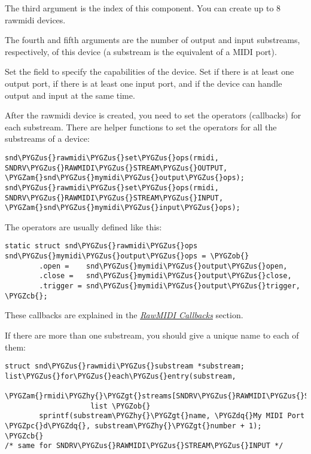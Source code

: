 \documentclass[a4paper,8pt,english]{sphinxmanual}
\def\PYGZus{\char`\_}
\def\PYGZob{\char`\{}
\def\PYGZcb{\char`\}}
\def\PYGZam{\char`\&}
\def\PYGZgt{\char`\>}
\def\PYGZpc{\char`\%}
\def\PYGZhy{\char`\-}
\def\PYGZdq{\char`\"}
\begin{document}
The third argument is the index of this component. You can create up to
8 rawmidi devices.

The fourth and fifth arguments are the number of output and input
substreams, respectively, of this device (a substream is the equivalent
of a MIDI port).

Set the  field to specify the capabilities of the
device. Set  if there is at least one
output port,  if there is at least one
input port, and  if the device can handle
output and input at the same time.

After the rawmidi device is created, you need to set the operators
(callbacks) for each substream. There are helper functions to set the
operators for all the substreams of a device:

\begin{Verbatim}[commandchars=\\\{\}]
snd\PYGZus{}rawmidi\PYGZus{}set\PYGZus{}ops(rmidi, SNDRV\PYGZus{}RAWMIDI\PYGZus{}STREAM\PYGZus{}OUTPUT, \PYGZam{}snd\PYGZus{}mymidi\PYGZus{}output\PYGZus{}ops);
snd\PYGZus{}rawmidi\PYGZus{}set\PYGZus{}ops(rmidi, SNDRV\PYGZus{}RAWMIDI\PYGZus{}STREAM\PYGZus{}INPUT, \PYGZam{}snd\PYGZus{}mymidi\PYGZus{}input\PYGZus{}ops);
\end{Verbatim}

The operators are usually defined like this:

\begin{Verbatim}[commandchars=\\\{\}]
static struct snd\PYGZus{}rawmidi\PYGZus{}ops snd\PYGZus{}mymidi\PYGZus{}output\PYGZus{}ops = \PYGZob{}
        .open =    snd\PYGZus{}mymidi\PYGZus{}output\PYGZus{}open,
        .close =   snd\PYGZus{}mymidi\PYGZus{}output\PYGZus{}close,
        .trigger = snd\PYGZus{}mymidi\PYGZus{}output\PYGZus{}trigger,
\PYGZcb{};
\end{Verbatim}

These callbacks are explained in the {\hyperref[sound/kernel\string-api/writing\string-an\string-alsa\string-driver:rawmidi\string-callbacks]{\emph{RawMIDI Callbacks}}} section.

If there are more than one substream, you should give a unique name to
each of them:

\begin{Verbatim}[commandchars=\\\{\}]
struct snd\PYGZus{}rawmidi\PYGZus{}substream *substream;
list\PYGZus{}for\PYGZus{}each\PYGZus{}entry(substream,
                    \PYGZam{}rmidi\PYGZhy{}\PYGZgt{}streams[SNDRV\PYGZus{}RAWMIDI\PYGZus{}STREAM\PYGZus{}OUTPUT].substreams,
                    list \PYGZob{}
        sprintf(substream\PYGZhy{}\PYGZgt{}name, \PYGZdq{}My MIDI Port \PYGZpc{}d\PYGZdq{}, substream\PYGZhy{}\PYGZgt{}number + 1);
\PYGZcb{}
/* same for SNDRV\PYGZus{}RAWMIDI\PYGZus{}STREAM\PYGZus{}INPUT */
\end{Verbatim}
\end{document}
